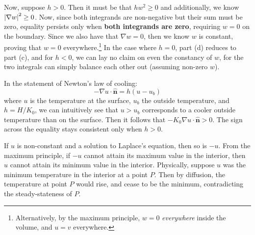 \documentclass[a4paper]{article}
\begin{document}
\begin{enumerate}[label=(\alph*)]
\[	\]
	Now, suppose \( h > 0 \). Then it must be that \( hw^{2} \ge 0 \) and additionally, we know \( \abs{\nabla w}^{2} \ge 0 \). Now, since both integrands are non-negative but their sum must be zero, equality persists only when \textbf{both integrands are zero}, requiring \( w = 0 \) on the boundary. Since we also have that \( \nabla w = 0 \), then we know \( w \) is constant, proving that \( w = 0 \) everywhere.\footnote{Alternatively, by the maximum principle, \( w = 0 \) \textit{everywhere} inside the volume, and \( u = v \) everywhere.} In the case where \( h = 0 \), part (d) reduces to part (c), and for \( h < 0 \), we can lay no claim on even the constancy of \( w \), for the two integrals can simply balance each other out (assuming non-zero \( w \)).

	In the statement of Newton's law of cooling:
	\[
		-\nabla u \cdot \pmb{\hat{n}} = h \!\left( u - u_{b} \right) 
	\]
	where \( u \) is the temperature at the surface, \( u_{b} \) the outside temperature, and \( h = H / K_{0} \), we can intuitively see that \( u > u_{b} \) corresponds to a cooler outside temperature than on the surface. Then it follows that \( -K_{0}\nabla u \cdot \pmb{\hat{n}} > 0 \). The sign across the equality stays consistent only when \( h > 0 \).
\end{enumerate}


If \( u \) is non-constant and a solution to Laplace's equation, then so is \( -u \). From the maximum principle, if \( -u \) cannot attain its maximum value in the interior, then \( u \) cannot attain its minimum value in the interior. Physically, suppose \( u \) was the minimum temperature in the interior at a point \( P \). Then by diffusion, the temperature at point \( P \) would rise, and cease to be the minimum, contradicting the steady-stateness of \( P \).

\vspace{12pt}

\end{document}
